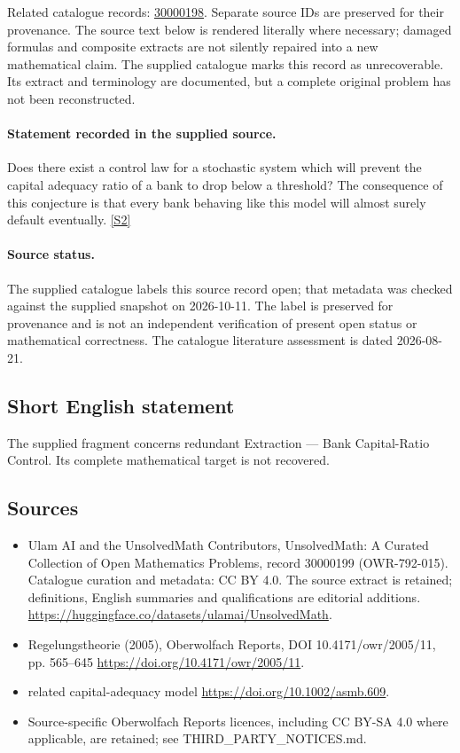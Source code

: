 \documentclass[11pt]{article}
\begin{document}
Related catalogue records: \href{https://mehmetmars7.github.io/Erdosproblems-llm-hunter/problem.html?type=open_problems&id=30000198}{30000198}. Separate source IDs are preserved for their provenance.
The source text below is rendered literally where necessary; damaged formulas and composite extracts are not silently repaired into a new mathematical claim.
The supplied catalogue marks this record as unrecoverable. Its extract and terminology are documented, but a complete original problem has not been reconstructed.
\paragraph{Statement recorded in the supplied source.}
Does there exist a control law for a stochastic system which will prevent the capital adequacy ratio of a bank to drop below a threshold? The consequence of this conjecture is that every bank behaving like this model will almost surely default eventually. \href{https://doi.org/10.4171/owr/2005/11}{[S2]}
\paragraph{Source status.}
The supplied catalogue labels this source record open; that metadata was checked against the supplied snapshot on 2026-10-11. The label is preserved for provenance and is not an independent verification of present open status or mathematical correctness. The catalogue literature assessment is dated 2026-08-21.
\subsection{Short English statement}
The supplied fragment concerns redundant Extraction — Bank Capital-Ratio Control. Its complete mathematical target is not recovered.
\subsection{Sources}
\begin{itemize}
\item[S1] Ulam AI and the UnsolvedMath Contributors, UnsolvedMath: A Curated Collection of Open Mathematics Problems, record 30000199 (OWR-792-015). Catalogue curation and metadata: CC BY 4.0. The source extract is retained; definitions, English summaries and qualifications are editorial additions.
\url{https://huggingface.co/datasets/ulamai/UnsolvedMath}.
\item[S2] Regelungstheorie (2005), Oberwolfach Reports, DOI 10.4171/owr/2005/11, pp. 565--645
\url{https://doi.org/10.4171/owr/2005/11}.
\item[S3] related capital-adequacy model
\url{https://doi.org/10.1002/asmb.609}.
\item Source-specific Oberwolfach Reports licences, including CC BY-SA 4.0 where applicable, are retained; see THIRD\_PARTY\_NOTICES.md.
\end{itemize}
\end{document}

